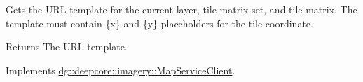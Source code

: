 Gets the U\+RL template for the current layer, tile matrix set, and tile matrix. The template must contain \{x\} and \{y\} placeholders for the tile coordinate. 

\begin{DoxyReturn}{Returns}
The U\+RL template. 
\end{DoxyReturn}


Implements \hyperlink{group___imagery_module_gaafa4e8cc2a047f6467e227603ccf1a23}{dg\+::deepcore\+::imagery\+::\+Map\+Service\+Client}.


